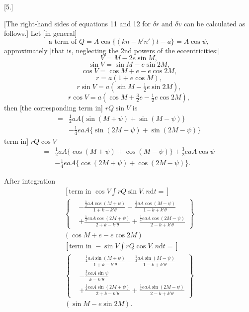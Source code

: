 \par\bigskip
\hypertarget{native-392-ceres5}{}
\begin{center}[5.]\end{center}
\noindent\hspace*{\parindent}[The right-hand sides of equations 11 and 12 for \(\delta r\) and \(\delta v\) can be calculated as follows.] Let [in general]
\[
\text{a term of }Q=A\cos\{(kn-k'n')t-a\}=A\cos\psi,
\]
 approximately [that is, neglecting the 2nd powers of the eccentricities:]
\[V=M-2e\sin M,\]
\[\sin V=\sin M-e\sin2M,\]
\[\cos V=\cos M+e-e\cos2M,\]
\[r=a(1+e\cos M),\]
\[r\sin V=a(\sin M-\tfrac12e\sin2M),\]
\[r\cos V=a(\cos M+\tfrac32e-\tfrac12e\cos2M),\]
\noindent then [the corresponding \hypertarget{native-393}{}term in] \(rQ\sin V\) is
\[
\begin{aligned}
={}&\tfrac12aA\{\sin(M+\psi)+\sin(M-\psi)\}\\
&-\tfrac14eaA\{\sin(2M+\psi)+\sin(2M-\psi)\}
\end{aligned}
\]
\noindent term in] \(rQ\cos V\)
\[
\begin{aligned}
={}&\tfrac12aA\{\cos(M+\psi)+\cos(M-\psi)\}+\tfrac32eaA\cos\psi\\
&-\tfrac14eaA\{\cos(2M+\psi)+\cos(2M-\psi)\}.
\end{aligned}
\]

After integration
\[
\begin{gathered}
{}[\text{term in }\cos V\int rQ\sin V\mathord{.}\,n\mathrm{d}t=]\\[1ex]
\left\{\begin{aligned}
&-\frac{\tfrac12aA\cos(M+\psi)}{1+k-k'\theta}-\frac{\tfrac12aA\cos(M-\psi)}{1-k+k'\theta}\\
&+\frac{\tfrac14eaA\cos(2M+\psi)}{2+k-k'\theta}+\frac{\tfrac14eaA\cos(2M-\psi)}{2-k+k'\theta}
\end{aligned}\right\}\\[1ex]
(\cos M+e-e\cos2M)
\end{gathered}
\]
\[
\begin{gathered}
{}[\text{term in }-\sin V\int rQ\cos V\mathord{.}\,n\mathrm{d}t=]\\[1ex]
\left\{\begin{aligned}
&-\frac{\tfrac12aA\sin(M+\psi)}{1+k-k'\theta}-\frac{\tfrac12aA\sin(M-\psi)}{1-k+k'\theta}\\
&-\frac{\tfrac32eaA\sin\psi}{k-k'\theta}\\
&+\frac{\tfrac14eaA\sin(2M+\psi)}{2+k-k'\theta}+\frac{\tfrac14eaA\sin(2M-\psi)}{2-k+k'\theta}
\end{aligned}\right\}\\[1ex]
(\sin M-e\sin2M).
\end{gathered}
\]

